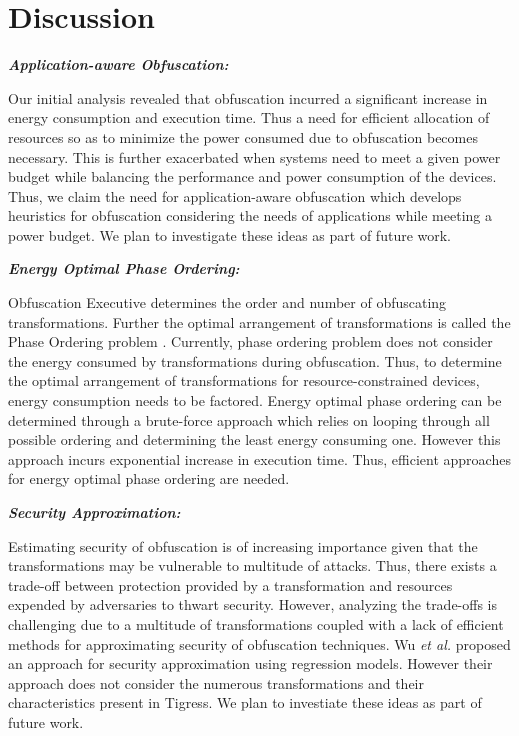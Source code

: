 
\section{Discussion}
\label{sec:discussion}

\emph{\textbf{Application-aware Obfuscation:}}

Our initial analysis revealed that obfuscation incurred a significant increase in energy consumption and execution time. Thus a need for efficient allocation of resources so as to minimize the power consumed due to obfuscation becomes necessary. This is further exacerbated when systems need to meet a given power budget while balancing the performance and power consumption of the devices. Thus, we claim the need for application-aware obfuscation which develops heuristics for obfuscation considering the needs of applications while meeting a power budget. We plan to investigate these ideas as part of future work.  

\emph{\textbf{Energy Optimal Phase Ordering:}}

Obfuscation Executive \cite{heffner} determines the order and number of obfuscating transformations. Further the optimal arrangement of transformations is called the Phase Ordering problem \cite{holder}. Currently, phase ordering problem does not consider the energy consumed by transformations during obfuscation. Thus, to determine the optimal arrangement of transformations for resource-constrained devices, energy consumption needs to be factored. Energy optimal phase ordering can be determined through a brute-force approach which relies on looping through all possible ordering and determining the least energy consuming one. However this approach incurs exponential increase in execution time. Thus, efficient approaches for energy optimal phase ordering are needed.       

\emph{\textbf{Security Approximation:}}

Estimating security of obfuscation is of increasing importance given that the transformations may be vulnerable to multitude of attacks. Thus, there exists a trade-off between protection provided by a transformation and resources expended by adversaries to thwart security. However, analyzing the trade-offs is challenging due to a multitude of transformations coupled with a lack of efficient methods for approximating security of obfuscation techniques. Wu \textit{et al.} \cite{wu2010framework} proposed an approach for security approximation using regression models. However their approach does not consider the numerous transformations and their characteristics present in Tigress. We plan to investiate these ideas as part of future work.  


